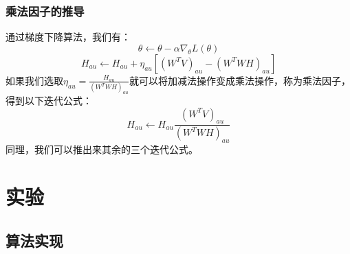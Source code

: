 \documentclass[UTF8,mathserif]{beamer}
\begin{document}
\begin{frame}
\frametitle{乘法因子的推导}
    \indent 通过梯度下降算法，我们有：\\
    \begin{equation}
        \theta\leftarrow\theta-\alpha\nabla_{\theta}L(\theta)
    \end{equation}
    \begin{equation}
        H_{au}\leftarrow H_{au}+\eta_{au}[(W^{T}V)_{au}-(W^{T}WH)_{au}]
    \end{equation}
    \indent 如果我们选取$\eta_{au}=\frac{H_{au}}{(W^{T}WH)_{au}}$就可以将加减法操作变成乘法操作，称为乘法因子，得到以下迭代公式：\\
    \begin{equation}
        H_{au}\leftarrow H_{au}\frac{(W^{T}V)_{au}}{(W^{T}WH)_{au}}
    \end{equation}
    \indent 同理，我们可以推出来其余的三个迭代公式。
\end{frame}


\section{实验}

\subsection{算法实现}
\end{document}
